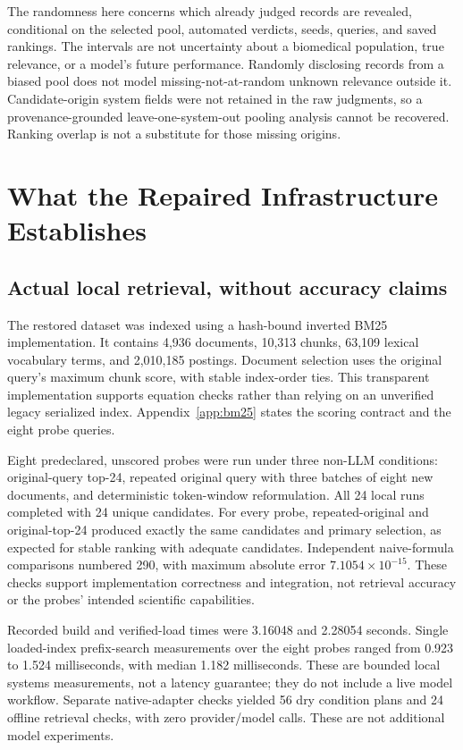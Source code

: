 The randomness here concerns which already judged records are revealed, conditional on the selected pool, automated verdicts, seeds, queries, and saved rankings. The intervals are not uncertainty about a biomedical population, true relevance, or a model's future performance. Randomly disclosing records from a biased pool does not model missing-not-at-random unknown relevance outside it. Candidate-origin system fields were not retained in the raw judgments, so a provenance-grounded leave-one-system-out pooling analysis cannot be recovered. Ranking overlap is not a substitute for those missing origins.

\section{What the Repaired Infrastructure Establishes}
\label{sec:software}
\subsection{Actual local retrieval, without accuracy claims}
The restored dataset was indexed using a hash-bound inverted BM25 implementation. It contains 4,936 documents, 10,313 chunks, 63,109 lexical vocabulary terms, and 2,010,185 postings. Document selection uses the original query's maximum chunk score, with stable index-order ties. This transparent implementation supports equation checks rather than relying on an unverified legacy serialized index. Appendix~\ref{app:bm25} states the scoring contract and the eight probe queries.

Eight predeclared, unscored probes were run under three non-LLM conditions: original-query top-24, repeated original query with three batches of eight new documents, and deterministic token-window reformulation. All 24 local runs completed with 24 unique candidates. For every probe, repeated-original and original-top-24 produced exactly the same candidates and primary selection, as expected for stable ranking with adequate candidates. Independent naive-formula comparisons numbered 290, with maximum absolute error $7.1054\times10^{-15}$. These checks support implementation correctness and integration, not retrieval accuracy or the probes' intended scientific capabilities.

Recorded build and verified-load times were 3.16048 and 2.28054 seconds. Single loaded-index prefix-search measurements over the eight probes ranged from 0.923 to 1.524 milliseconds, with median 1.182 milliseconds. These are bounded local systems measurements, not a latency guarantee; they do not include a live model workflow. Separate native-adapter checks yielded 56 dry condition plans and 24 offline retrieval checks, with zero provider/model calls. These are not additional model experiments.

